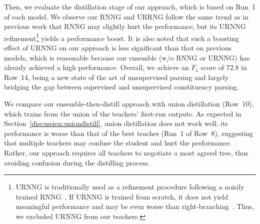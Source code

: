 \documentclass{article}
\begin{document}
Then, we evaluate the distillation stage of our approach, which is based on Run~1 of each model. We observe our RNNG and URRNG follow the same trend as in previous work that RNNG may slightly hurt the performance, but its URNNG refinement\footnote{URNNG is traditionally used as a refinement procedure following a noisily trained RNNG~\citep{kim-etal-2019-compound, cao-etal-2020-unsupervised}. If URNNG is trained from scratch, it does not yield meaningful performance and may be even worse than right-branching~\citep{kim-etal-2019-unsupervised}. Thus, we excluded URNNG from our teachers.} yields a performance boost. 
It is also noted that such a boosting effect of URNNG on our approach is less significant than that on previous models, which is reasonable because our ensemble (w/o RNNG or URNNG) has already achieved a high performance. Overall, we achieve an $F_1$ score of $72.8$ in Row~14, being a new state of the art of unsupervised parsing and largely bridging the gap between supervised and unsupervised constituency parsing.

We compare our ensemble-then-distill approach with union distillation (Row~10), which trains from the union of the teachers' first-run outputs. As expected in Section~\ref{discussion:uniondistill}, union distillation does not work well; its performance is worse than that of the best teacher (Run~1 of Row~8), suggesting that multiple teachers may confuse the student and hurt the performance. Rather, our approach requires all teachers to negotiate a most agreed tree, thus avoiding confusion during the distilling process. 
\end{document}
